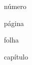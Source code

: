
\begin{listadeabreviaturas}
  \item[n.] número
  \item[p.] página
  \item[f.] folha
  \item[cap.] capítulo
\end{listadeabreviaturas}

